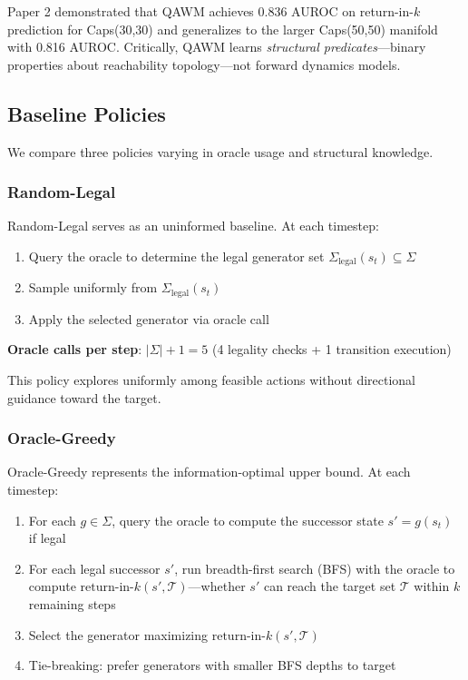 Paper 2 demonstrated that QAWM achieves 0.836 AUROC on return-in-$k$ prediction for Caps(30,30) and generalizes to the larger Caps(50,50) manifold with 0.816 AUROC. Critically, QAWM learns \textit{structural predicates}—binary properties about reachability topology—not forward dynamics models.

\subsection{Baseline Policies}

We compare three policies varying in oracle usage and structural knowledge.

\subsubsection{Random-Legal}

Random-Legal serves as an uninformed baseline. At each timestep:

\begin{enumerate}
\item Query the oracle to determine the legal generator set $\Sigma_{\text{legal}}(s_t) \subseteq \Sigma$
\item Sample uniformly from $\Sigma_{\text{legal}}(s_t)$
\item Apply the selected generator via oracle call
\end{enumerate}

\textbf{Oracle calls per step}: $|\Sigma| + 1 = 5$ (4 legality checks + 1 transition execution)

This policy explores uniformly among feasible actions without directional guidance toward the target.

\subsubsection{Oracle-Greedy}

Oracle-Greedy represents the information-optimal upper bound. At each timestep:

\begin{enumerate}
\item For each $g \in \Sigma$, query the oracle to compute the successor state $s' = g(s_t)$ if legal
\item For each legal successor $s'$, run breadth-first search (BFS) with the oracle to compute $\text{return-in-}k(s', \mathcal{T})$—whether $s'$ can reach the target set $\mathcal{T}$ within $k$ remaining steps
\item Select the generator maximizing $\text{return-in-}k(s', \mathcal{T})$
\item Tie-breaking: prefer generators with smaller BFS depths to target
\end{enumerate}

